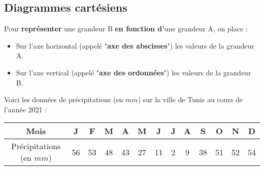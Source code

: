 \begin{pageCours}
\begin{pageCours}
\begin{pageAD} 



 


 


\end{pageAD}


\begin{PageCours}
\section{Diagrammes cartésiens}

\begin{Def}
Pour \textbf{représenter} une grandeur B \textbf{en fonction d'}une grandeur A, on place :
\begin{itemize}
\item Sur l'axe horizontal (appelé "\textbf{axe des abscisses}") les valeurs de la grandeur A.
\item Sur l'axe vertical (appelé "\textbf{axe des ordonnées}") les valeurs de la grandeur B.
\end{itemize}
\end{Def}

\begin{Ex}
Voici les données de précipitations (en $mm$) sur la ville de Tunis au cours de l'année 2021 : 
\begin{center}
\begin{tabular}{c|c|c|c|c|c|c|c|c|c|c|c|c}
Mois & J & F & M & A & M & J & J & A & S & O & N & D \\\hline
Précipitations (en $mm$) & 56 & 53 & 48 & 43 & 27 & 11 & 2 & 9 & 38 & 51 & 52 & 54 \\
\end{tabular}
\end{center}
\end{Ex}



\end{PageCours}
\end{pageCours}
\end{pageCours}
